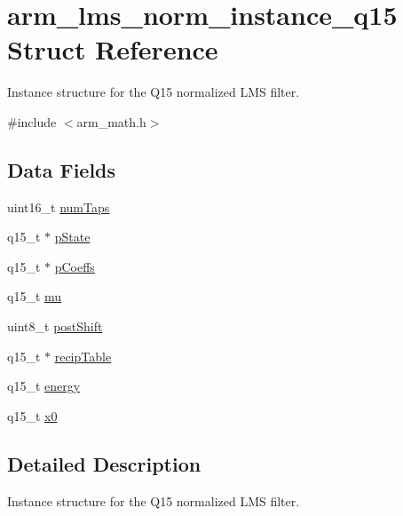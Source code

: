 \hypertarget{structarm__lms__norm__instance__q15}{}\section{arm\+\_\+lms\+\_\+norm\+\_\+instance\+\_\+q15 Struct Reference}
\label{structarm__lms__norm__instance__q15}


Instance structure for the Q15 normalized L\+MS filter.  




{\ttfamily \#include $<$arm\+\_\+math.\+h$>$}

\subsection*{Data Fields}
\begin{DoxyCompactItemize}
\item 
uint16\+\_\+t \mbox{\hyperlink{structarm__lms__norm__instance__q15_a751941891e47f522a7f5375fe8990aac}{num\+Taps}}
\item 
q15\+\_\+t $\ast$ \mbox{\hyperlink{structarm__lms__norm__instance__q15_ae29dfdb736374fcddaeaec4b7770170c}{p\+State}}
\item 
q15\+\_\+t $\ast$ \mbox{\hyperlink{structarm__lms__norm__instance__q15_a7ca181a37f714d174445f486bebce26f}{p\+Coeffs}}
\item 
q15\+\_\+t \mbox{\hyperlink{structarm__lms__norm__instance__q15_aab4745770bd667de040227eec1b5ff8d}{mu}}
\item 
uint8\+\_\+t \mbox{\hyperlink{structarm__lms__norm__instance__q15_a74050e9f36542bd56f4052381a82ae8f}{post\+Shift}}
\item 
q15\+\_\+t $\ast$ \mbox{\hyperlink{structarm__lms__norm__instance__q15_a39b65b32f68643831304cece01e093bd}{recip\+Table}}
\item 
q15\+\_\+t \mbox{\hyperlink{structarm__lms__norm__instance__q15_ae7a8ccabc82348f6742ca7a2b3da2a41}{energy}}
\item 
q15\+\_\+t \mbox{\hyperlink{structarm__lms__norm__instance__q15_a3c975fed200b19723a2ed11efccca6cd}{x0}}
\end{DoxyCompactItemize}


\subsection{Detailed Description}
Instance structure for the Q15 normalized L\+MS filter. 

